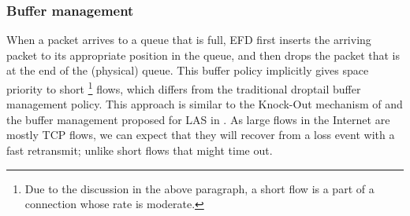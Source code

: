 \documentclass[preprint,12pt]{elsarticle}
\begin{document}
% 

\subsubsection{Buffer management}
When a packet arrives to a queue that is full, EFD first inserts the arriving packet to its appropriate position in the queue, and then drops the packet that is at the end of the (physical) queue. This buffer policy implicitly gives space priority to short \footnote{Due to the discussion in the above paragraph, a short flow is a part of a connection whose rate is moderate.} flows, which differs from the traditional droptail buffer management policy. This approach is similar to the Knock-Out mechanism of \cite{DivakaranCAP10} and the buffer management proposed for LAS in \cite{Rai04size-basedscheduling}. As large flows in the Internet are mostly TCP flows, we can expect that they will recover from a loss event with a fast retransmit; unlike short flows that might time out. %

\end{document}
